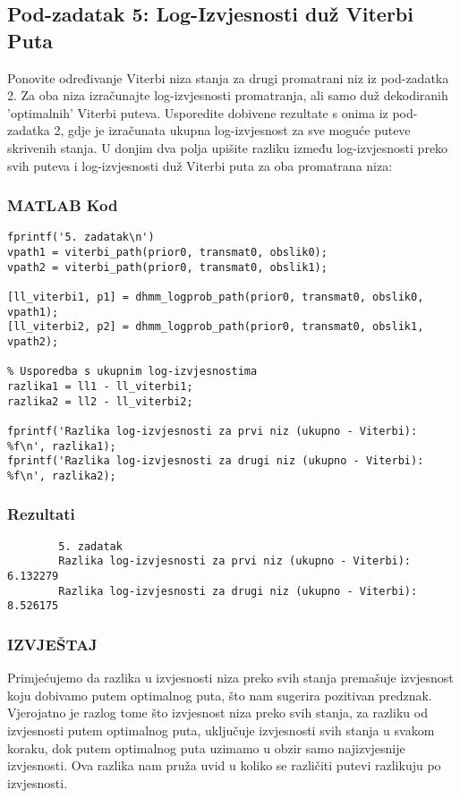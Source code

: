 \documentclass[12pt]{article}
\begin{document}
	\subsection{Pod-zadatak 5: Log-Izvjesnosti duž Viterbi Puta}
	Ponovite određivanje Viterbi niza stanja za drugi promatrani niz iz pod-zadatka 2. Za oba niza izračunajte log-izvjesnosti promatranja, ali samo duž dekodiranih 'optimalnih' Viterbi puteva. Usporedite dobivene rezultate s onima iz pod-zadatka 2, gdje je izračunata ukupna log-izvjesnost za sve moguće puteve skrivenih stanja. U donjim dva polja upišite razliku između log-izvjesnosti preko svih puteva i log-izvjesnosti duž Viterbi puta za oba promatrana niza:
	
	\subsubsection*{MATLAB Kod}
	\begin{lstlisting}
fprintf('5. zadatak\n')          
vpath1 = viterbi_path(prior0, transmat0, obslik0);
vpath2 = viterbi_path(prior0, transmat0, obslik1);

[ll_viterbi1, p1] = dhmm_logprob_path(prior0, transmat0, obslik0, vpath1);
[ll_viterbi2, p2] = dhmm_logprob_path(prior0, transmat0, obslik1, vpath2);

% Usporedba s ukupnim log-izvjesnostima
razlika1 = ll1 - ll_viterbi1;
razlika2 = ll2 - ll_viterbi2;

fprintf('Razlika log-izvjesnosti za prvi niz (ukupno - Viterbi): %f\n', razlika1);
fprintf('Razlika log-izvjesnosti za drugi niz (ukupno - Viterbi): %f\n', razlika2);
	\end{lstlisting}
	
	\subsubsection*{Rezultati}
	\begin{verbatim}
		5. zadatak
		Razlika log-izvjesnosti za prvi niz (ukupno - Viterbi): 6.132279
		Razlika log-izvjesnosti za drugi niz (ukupno - Viterbi): 8.526175
	\end{verbatim}
	
	\subsubsection*{IZVJEŠTAJ}
	Primjećujemo da razlika u izvjesnosti niza preko svih stanja premašuje izvjesnost koju dobivamo putem optimalnog puta, što nam sugerira pozitivan predznak. Vjerojatno je razlog tome što izvjesnost niza preko svih stanja, za razliku od izvjesnosti putem optimalnog puta, uključuje izvjesnosti svih stanja u svakom koraku, dok putem optimalnog puta uzimamo u obzir samo najizvjesnije izvjesnosti. Ova razlika nam pruža uvid u koliko se različiti putevi razlikuju po izvjesnosti.
	
\end{document}
